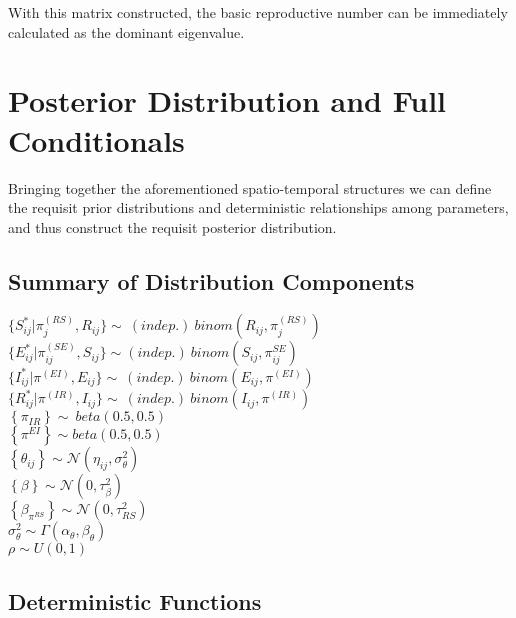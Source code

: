 \documentclass[12pt]{article}
\newcommand \noi {\noindent}
\begin{document}
With this matrix constructed, the basic reproductive number can be immediately calculated as the dominant eigenvalue. 


\section{Posterior Distribution and Full Conditionals}
Bringing together the aforementioned spatio-temporal structures we can define the requisit prior distributions and 
deterministic relationships among parameters, and thus construct the requisit posterior distribution. 

\subsection{Summary of Distribution Components}
\noi $\{S_{ij}^* | \pi_j^{(RS)}, R_{ij}\} \sim\ (indep.)\  binom(R_{ij}, \pi_j^{(RS)})$\\

\noi $\{E_{ij}^* | \pi^{(SE)}_{ij}, S_{ij} \} \sim (indep.)\ binom(S_{ij}, \pi^{SE}_{ij})$ \\

\noi $\{I_{ij}^* | \pi^{(EI)}, E_{ij} \} \sim\ (indep.)\ binom(E_{ij}, \pi^{(EI)})$\\

\noi $\{R_{ij}^* | \pi^{(IR)}, I_{ij}\} \sim\ (indep.)\ binom(I_{ij}, \pi^{(IR)})$\\

\noi $\left\{\pi_{IR}  \right\} \sim\ beta(0.5, 0.5)$\\ 

\noi $\left\{\pi^{EI}  \right\} \sim beta(0.5, 0.5)$\\ 

\noi $\left\{ \theta_{ij}\right\} \sim \mathcal{N}(\eta_{ij}, \sigma^2_{\theta})$ \\

\noi $\left\{ \beta \right\} \sim \mathcal{N}(0, \tau^2_\beta) $\\ 

\noi $\left\{ \beta_{\pi^{RS}} \right\} \sim \mathcal{N}(0, \tau^2_{RS}) $\\ 

\noi $\sigma^2_{\theta} \sim \Gamma(\alpha_\theta, \beta_\theta)$\\

\noi $\rho \sim U(0,1)$


\subsection{Deterministic Functions}
\end{document}
